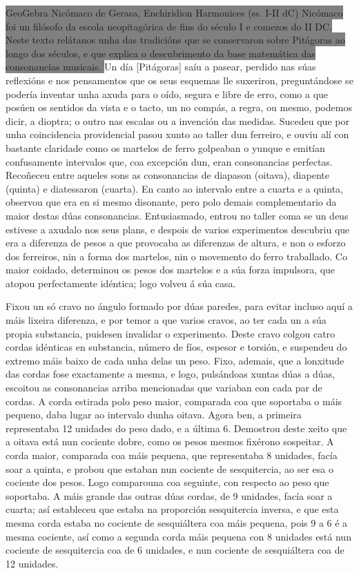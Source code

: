 %
\colorbox{gray}{GeoGebra
Nicómaco de Gerasa, Enchiridion Harmonices (ss. I-II dC)
Nicómaco foi un filósofo da escola neopitagórica de fins do século I e comezos do II DC. Neste texto relátanos unha das tradicións que se conservaron sobre Pitágoras ao longo dos séculos, e que explica o descubrimento da base matemática das consonancias musicais.
}
Un día [Pitágoras] saíu a pasear, perdido nas súas reflexións e nos pensamentos que os seus esquemas lle suxeriron, preguntándose se podería inventar unha axuda para o oído, segura e libre de erro, como a que posúen os sentidos da vista e o tacto, un no compás, a regra, ou mesmo, podemos dicir, a dioptra; o outro nas escalas ou a invención das medidas. Sucedeu que por unha coincidencia providencial pasou xunto ao taller dun ferreiro, e ouviu alí con bastante claridade como os martelos de ferro golpeaban o yunque e emitían confusamente intervalos que, coa excepción dun, eran consonancias perfectas. Recoñeceu entre aqueles sons as consonancias de diapason (oitava), diapente (quinta) e diatessaron (cuarta). En canto ao intervalo entre a cuarta e a quinta, observou que era en si mesmo disonante, pero polo demais complementario da maior destas dúas consonancias. Entusiasmado, entrou no taller coma se un deus estivese a axudalo nos seus plans, e despois de varios experimentos descubriu que era a diferenza de pesos a que provocaba as diferenzas de altura, e non o esforzo dos ferreiros, nin a forma dos martelos, nin o movemento do ferro traballado. Co maior coidado, determinou os pesos dos martelos e a súa forza impulsora, que atopou perfectamente idéntica; logo volveu á súa casa.

Fixou un só cravo no ángulo formado por dúas paredes, para evitar incluso aquí a máis lixeira diferenza, e por temor a que varios cravos, ao ter cada un a súa propia substancia, puidesen invalidar o experimento. Deste cravo colgou catro cordas idénticas en substancia, número de fíos, espesor e torsión, e suspendeu do extremo máis baixo de cada unha delas un peso. Fixo, ademais, que a lonxitude das cordas fose exactamente a mesma, e logo, pulsándoas xuntas dúas a dúas, escoitou as consonancias arriba mencionadas que variaban con cada par de cordas. A corda estirada polo peso maior, comparada coa que soportaba o máis pequeno, daba lugar ao intervalo dunha oitava. Agora ben, a primeira representaba 12 unidades do peso dado, e a última 6. Demostrou deste xeito que a oitava está nun cociente dobre, como os pesos mesmos fixérono sospeitar. A corda maior, comparada coa máis pequena, que representaba 8 unidades, facía soar a quinta, e probou que estaban nun cociente de sesquitercia, ao ser esa o cociente dos pesos. Logo comparouna coa seguinte, con respecto ao peso que soportaba. A máis grande das outras dúas cordas, de 9 unidades, facía soar a cuarta; así estableceu que estaba na proporción sesquitercia inversa, e que esta mesma corda estaba no cociente de sesquiáltera coa máis pequena, pois 9 a 6 é a mesma cociente, así como a segunda corda máis pequena con 8 unidades está nun cociente de sesquitercia coa de 6 unidades, e nun cociente de sesquiáltera coa de 12 unidades.

